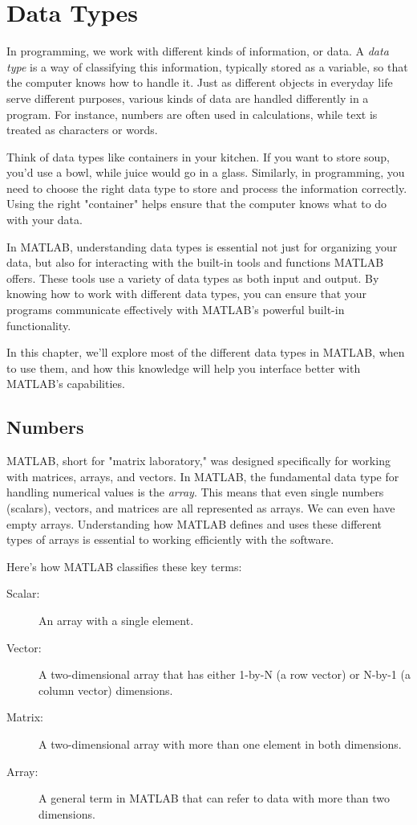 \documentclass[../../book.tex]{subfiles}
\begin{document}
\chapter{Data Types}
\label{c:datatypes}


In programming, we work with different kinds of information, or data. A \emph{data type} is a way of classifying this information, typically stored as a variable, so that the computer knows how to handle it. Just as different objects in everyday life serve different purposes, various kinds of data are handled differently in a program. For instance, numbers are often used in calculations, while text is treated as characters or words.

Think of data types like containers in your kitchen. If you want to store soup, you’d use a bowl, while juice would go in a glass. Similarly, in programming, you need to choose the right data type to store and process the information correctly. Using the right "container" helps ensure that the computer knows what to do with your data.

In MATLAB, understanding data types is essential not just for organizing your data, but also for interacting with the built-in tools and functions MATLAB offers. These tools use a variety of data types as both input and output. By knowing how to work with different data types, you can ensure that your programs communicate effectively with MATLAB’s powerful built-in functionality.

In this chapter, we'll explore most of the different data types in MATLAB, when to use them, and how this knowledge will help you interface better with MATLAB's capabilities.

\section{Numbers}

MATLAB, short for "matrix laboratory," was designed specifically for working with matrices, arrays, and vectors. In MATLAB, the fundamental data type for handling numerical values is the \emph{array}. This means that even single numbers (scalars), vectors, and matrices are all represented as arrays. We can even have empty arrays.  Understanding how MATLAB defines and uses these different types of arrays is essential to working efficiently with the software.

Here’s how MATLAB classifies these key terms:

\begin{description}
\item[Scalar:] An array with a single element.
\item[Vector:] A two-dimensional array that has either 1-by-N (a row vector) or N-by-1 (a column vector) dimensions.
\item[Matrix:] A two-dimensional array with more than one element in both dimensions.
\item[Array:] A general term in MATLAB that can refer to data with more than two dimensions.
\end{description}
\end{document}
